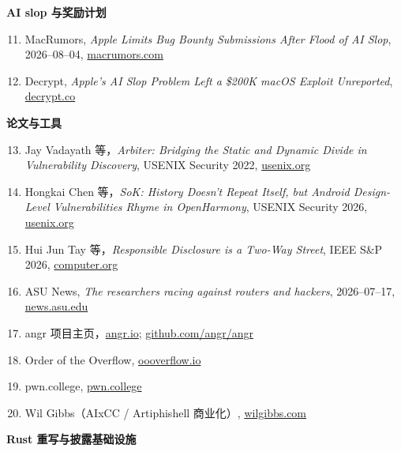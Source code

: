 \documentclass[a4paper,11pt]{article}
\begin{document}
\textbf{AI slop 与奖励计划}

\begin{enumerate}\setcounter{enumi}{10}
\item MacRumors, \emph{Apple Limits Bug Bounty Submissions After Flood of AI Slop}, 2026--08--04, \href{https://www.macrumors.com/2026/08/04/aple-bug-bounty-limits-ai/}{macrumors.com}
\item Decrypt, \emph{Apple's AI Slop Problem Left a \$200K macOS Exploit Unreported}, \href{https://decrypt.co/374900/apples-ai-slop-problem-left-a-200k-macos-exploit-unreported}{decrypt.co}
\end{enumerate}

\textbf{论文与工具}

\begin{enumerate}\setcounter{enumi}{12}
\item Jay Vadayath 等，\emph{Arbiter: Bridging the Static and Dynamic Divide in Vulnerability Discovery}, USENIX Security 2022, \href{https://www.usenix.org/system/files/usenixsecurity22-vadayath.pdf}{usenix.org}
\item Hongkai Chen 等，\emph{SoK: History Doesn't Repeat Itself, but Android Design-Level Vulnerabilities Rhyme in OpenHarmony}, USENIX Security 2026, \href{https://www.usenix.org/conference/usenixsecurity26/presentation/chen-hongkai}{usenix.org}
\item Hui Jun Tay 等，\emph{Responsible Disclosure is a Two-Way Street}, IEEE S\&P 2026, \href{https://www.computer.org/csdl/proceedings-article/sp/2026/606500c889/2geEWDpPYac}{computer.org}
\item ASU News, \emph{The researchers racing against routers and hackers}, 2026--07--17, \href{https://news.asu.edu/b/20260717-researchers-racing-against-routers-and-hackers}{news.asu.edu}
\item angr 项目主页，\href{https://angr.io/}{angr.io}; \href{https://github.com/angr/angr}{github.com/angr/angr}
\item Order of the Overflow, \href{https://oooverflow.io/philosophy.html}{oooverflow.io}
\item pwn.college, \href{https://pwn.college/}{pwn.college}
\item Wil Gibbs（AIxCC / Artiphishell 商业化）, \href{https://wilgibbs.com/}{wilgibbs.com}
\end{enumerate}

\textbf{Rust 重写与披露基础设施}
\end{document}
